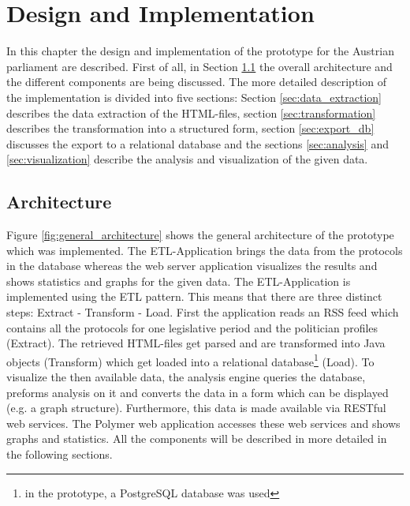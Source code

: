 \chapter{Design and Implementation}
\label{chap:implementation}

In this chapter the design and implementation of the prototype for the Austrian parliament are described. First of all, in Section \ref{sec:architecture} the overall architecture and the different components are being discussed. The more detailed description of the implementation is divided into five sections: Section \ref{sec:data_extraction} describes the data extraction of the HTML-files, section \ref{sec:transformation} describes the transformation into a structured form, section \ref{sec:export_db} discusses the export to a relational database and the sections \ref{sec:analysis} and \ref{sec:visualization} describe the analysis and visualization of the given data.


\section{Architecture}
\label{sec:architecture}
Figure \ref{fig:general_architecture} shows the general architecture of the prototype which was implemented. The ETL-Application brings the data from the protocols in the database whereas the web server application visualizes the results and shows statistics and graphs for the given data. The ETL-Application is implemented using the ETL pattern. This means that there are three distinct steps: Extract - Transform - Load. First the application reads an RSS feed which contains all the protocols for one legislative period and the politician profiles (Extract). The retrieved HTML-files get parsed and are transformed into Java objects (Transform) which get loaded into a relational database\footnote{in the prototype, a PostgreSQL database was used} (Load). To visualize the then available data, the analysis engine queries the database, preforms analysis on it and converts the data in a form which can be displayed (e.g. a graph structure). Furthermore, this data is made available via RESTful web services. The Polymer web application accesses these web services and shows graphs and statistics. All the components will be described in more detailed in the following sections.

